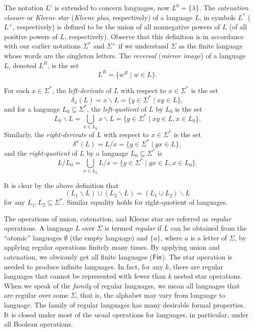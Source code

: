 The notation $L^i$ is extended to concern languages, now $L^0 = \{\lambda\}$. The \emph{catenation closure} or  \emph{Kleene star} (\emph{Kleene plus}, respectively) of a language $L$, in symbols $L^*$ ($L^+$, respectively) is defined to be the union of all nonnegative powers of $L$ (of all positive powers of $L$, respectively). Observe that this definition is in accordance with our earlier notations $\Sigma^*$ and $\Sigma^+$ if we understand $\Sigma$ as the finite language whose words are the singleton letters. The \emph{reversal} (\emph{mirror image}) of a language $L$, denoted $L^R$, is the set $$L^R = \{w^R \mid w \in L\}.$$

For each $x \in \Sigma^*$, the \emph{left-derivate} of $L$ with respect to $x \in \Sigma^*$ is the set $$\delta_x(L) = x \backslash L = \{y \in \Sigma^* \mid xy \in L\},$$ and for a language $L_0 \subseteq \Sigma^*$, the \emph{left-quotient} of $L$ by $L_0$ is the set $$L_0 \backslash L = \bigcup_{x \in L_0} x \backslash L = \{y \in \Sigma^* \mid xy \in L, x \in L_0\}.$$ Similarly, the \emph{right-derivate} of $L$ with respect to $x \in \Sigma^*$ is the set $$\delta^x(L) = L / x = \{y \in \Sigma^* \mid yx \in L\},$$ and the \emph{right-quotient} of $L$ by a language $L_0 \subseteq \Sigma^*$ is $$L / L_0 = \bigcup_{x \in L_0} L / x = \{y \in \Sigma^* \mid yx \in L, x \in L_0\}.$$

It is clear by the above definition that $$(L_1 \backslash L) \cup (L_2 \backslash L) = (L_1 \cup L_2) \backslash L$$ for any $L_1, L_2 \subseteq \Sigma^*$. Similar equality holds for right-quotient of languages.


The operations of union, catenation, and Kleene star are referred as \emph{regular} operations. A language $L$ over $\Sigma$ is termed \emph{regular} if $L$ can be obtained from the ``atomic'' languages $\emptyset$ (the  empty language) and $\{a\}$, where $a$ is a letter of $\Sigma$, by applying regular operations finitely many times. By applying union and catenation, we obviously get all finite languages \index{$\Fin$}($\Fin$). The star operation is needed to produce infinite languages. In fact, for any $k$, there are regular languages that cannot be represented with fewer than $k$ nested star operations. When we speak of the \emph{family} of regular languages, we mean all languages that are regular over some $\Sigma$, that is, the alphabet may vary from language to language. The family of regular languages has many desirable formal properties. It is closed under most of the usual operations for languages, in particular, under all Boolean operations.

